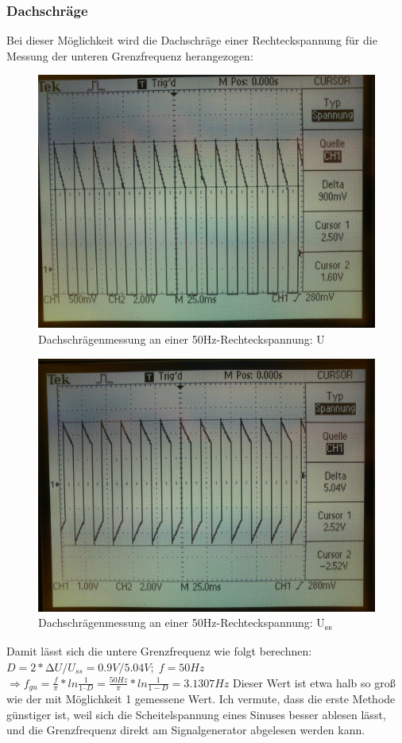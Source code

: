 \subsubsection*{Dachschräge}
Bei dieser Möglichkeit wird die Dachschräge einer Rechteckspannung für die Messung der unteren Grenzfrequenz herangezogen:
\begin{figure}[H]
	\centering
	\includegraphics[width=\linewidth]{versuch3/oszi/DSC_0300.JPG}
	\caption{Dachschrägenmessung an einer 50Hz-Rechteckspannung: \Delta U}
\end{figure}
\begin{figure}[H]
	\centering
	\includegraphics[width=\linewidth]{versuch3/oszi/DSC_0304.JPG}
	\caption{Dachschrägenmessung an einer 50Hz-Rechteckspannung: U\textsubscript{ss}}
\end{figure}
Damit lässt sich die untere Grenzfrequenz wie folgt berechnen:\\
$ D = 2 * ∆U/U_{ss}=0.9V/5.04V;\; f=50Hz $ \\
$ \Rightarrow f_{gu}=\frac{f}{\pi} * ln \frac{1}{1 – D} = \frac{50Hz}{\pi}*ln\frac{1}{1-D} = 3.1307 Hz $
Dieser Wert ist etwa halb so groß wie der mit Möglichkeit 1 gemessene Wert. Ich vermute, dass die erste Methode günstiger ist, weil sich die Scheitelspannung eines Sinuses besser ablesen lässt, und die Grenzfrequenz direkt am Signalgenerator abgelesen werden kann.

